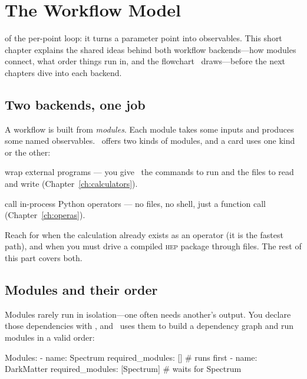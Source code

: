 \chapter{The Workflow Model}
\label{ch:workflow-model}

 of the per-point loop: it turns a parameter point into
observables. This short chapter explains the shared ideas behind both workflow backends---how
modules connect, what order things run in, and the flowchart \Jarvis\ draws---before the next
chapters dive into each backend.

\section{Two backends, one job}
\label{sec:wf-backends}

A workflow is built from \emph{modules}. Each module takes some inputs and produces some named
observables. \Jarvis\ offers two kinds of modules, and a card uses one kind or the other:

\begin{description}[style=nextline, leftmargin=1.2em]
  \item[\yamlkey{Calculators}] wrap external programs --- you give \Jarvis\ the commands to run
        and the files to read and write (Chapter~\ref{ch:calculators}).
  \item[\yamlkey{Operas}] call in-process Python operators --- no files, no shell, just a
        function call (Chapter~\ref{ch:operas}).
\end{description}

\begin{jtip}
Reach for  when the calculation already exists as an operator (it is the fastest
path), and  when you must drive a compiled \textsc{hep} package through
files. The rest of this part covers both.
\end{jtip}

\section{Modules and their order}
\label{sec:wf-order}

Modules rarely run in isolation---one often needs another's output. You declare those
dependencies with , and \Jarvis\ uses them to build a dependency
graph and run modules in a valid order:

\begin{yamlwin}
Modules:
  - name: Spectrum
    required_modules: []          # runs first
  - name: DarkMatter
    required_modules: [Spectrum]  # waits for Spectrum
\end{yamlwin}

